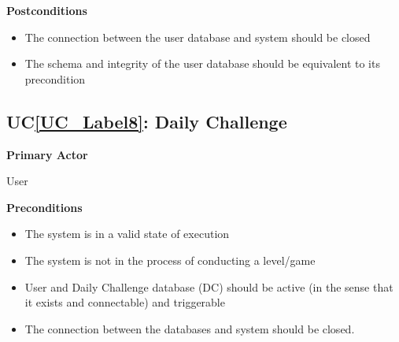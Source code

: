 \documentclass[12pt]{article}
\newcounter{ucnum} %
\newcommand{\ucref}[1]{UC\ref{#1}}
\begin{document}
\textbf{Postconditions}
\begin{itemize}
\item The connection between the user database and system should be closed
\item The schema and integrity of the user database should be equivalent to its precondition 
\end{itemize}


 \label{UC_Label8}
\subsection{\ucref{UC_Label8}: Daily Challenge}

\textbf{Primary Actor}

User

\textbf{Preconditions}
\begin{itemize}
\item The system is in a valid state of execution
\item The system is not in the process of conducting a level/game
\item User and Daily Challenge database (DC) should be active (in the sense that it exists and connectable) and triggerable
\item The connection between the databases and system should be closed.
\end{itemize}
\end{document}
